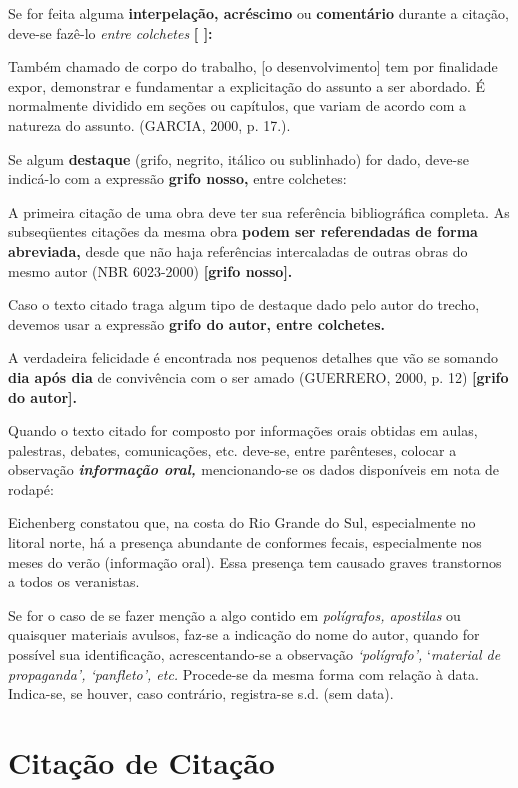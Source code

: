 \documentclass[rel_mlp]{iiufrgs}
\begin{document}
Se for feita alguma {\bf interpelação, acréscimo }ou {\bf comentário }durante a citação, deve-se fazê-lo {\it entre colchetes }{\bf [ ]:}

Também chamado de corpo do trabalho, [o desenvolvimento] tem por finalidade expor, demonstrar e fundamentar a explicitação do assunto a ser abordado. É normalmente dividido em seções ou capítulos, que variam de acordo com a natureza do assunto. (GARCIA, 2000, p. 17.).

Se algum {\bf destaque }(grifo, negrito, itálico ou sublinhado) for dado, deve-se indicá-lo com a expressão {\bf grifo nosso, }entre colchetes:

A primeira citação de uma obra deve ter sua referência bibliográfica completa. As subseqüentes citações da mesma obra {\bf podem ser referendadas de forma abreviada, }desde que não haja referências intercaladas de outras obras do mesmo autor (NBR 6023-2000) {\bf [grifo nosso].} 

Caso o texto citado traga algum tipo de destaque dado pelo autor do trecho, devemos usar a expressão {\bf grifo do autor, entre colchetes.}

A verdadeira felicidade é encontrada nos pequenos detalhes que vão se somando {\bf dia após dia }de convivência com o ser amado (GUERRERO, 2000, p. 12) {\bf [grifo do autor].}

Quando o texto citado for composto por informações orais obtidas em aulas, palestras, debates, comunicações, etc. deve-se, entre parênteses, colocar a observação {\bf {\it informação oral, }}mencionando-se os dados disponíveis em nota de rodapé:

Eichenberg constatou que, na costa do Rio Grande do Sul, especialmente no litoral norte, há a presença abundante de conformes fecais, especialmente nos meses do verão (informação oral). Essa presença tem causado graves transtornos a todos os veranistas.

Se for o caso de se fazer menção a algo contido em {\it polígrafos, apostilas }ou quaisquer materiais avulsos, faz-se a indicação do nome do autor, quando for possível sua identificação, acrescentando-se a observação {\it `polígrafo', }`{\it material de propaganda', `panfleto', etc. }Procede-se da mesma forma com relação à data. Indica-se, se houver, caso contrário, registra-se s.d. (sem data). 



\section{Citação de Citação}
\end{document}
